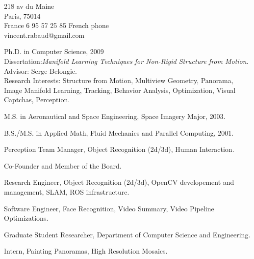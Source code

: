 

\addresses
{218 av du Maine\\
Paris, 75014\\
France}
{
6 95 57 25 85 French phone\\
vincent.rabaud@gmail.com}

\begin{llist}

 
Ph.D. in Computer Science, 2009\\
Dissertation:\textit{Manifold Learning Techniques for Non-Rigid Structure from
Motion}.\\
Advisor: Serge Belongie.\\
Research Interests: Structure from Motion, Multiview Geometry, Panorama, Image Manifold Learning, Tracking, Behavior Analysis, Optimization, Visual Captchas, Perception.

 
M.S. in Aeronautical and Space Engineering, Space Imagery Major, 2003.

 
B.S./M.S. in Applied Math, Fluid Mechanics and Parallel Computing, 2001.

Perception Team Manager, Object Recognition (2d/3d), Human Interaction.

Co-Founder and Member of the Board.

Research Engineer, Object Recognition (2d/3d), OpenCV developement and management, SLAM, ROS infrastructure.

Software Engineer, Face Recognition, Video Summary, Video Pipeline
Optimizations.

Graduate Student Researcher, Department of Computer Science and Engineering.

Intern, Painting Panoramas, High Resolution Mosaics.


\end{llist}
